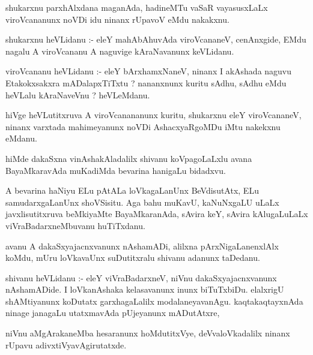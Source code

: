 \documentclass{article}
\begin{document}
\begin{mn}
shukarxnu  parxhAlxdana  maganAda,  hadineMTu  vaSaR  vayasusxLaLx  viroVcananunx  noVDi  idu  ninanx  
rUpavoV  eMdu  nakakxnu.
\end{mn}

\begin{mn}
shukarxnu  heVLidanu :- eleY  mahAbAhuvAda  viroVcananeV,  cenAnxgide,  EMdu  nagalu  A  viroVcananu  
A  naguvige  kAraNavanunx  keVLidanu.
\end{mn}

\begin{mn}
viroVcananu  heVLidanu :- eleY  bArxhamxNaneV,  ninanx  I  akAshada  naguvu  Etakokxsakxra  
mADalapxTiTxtu ?  nananxnunx  kuritu  sAdhu,  sAdhu  eMdu  heVLalu  kAraNaveVnu ?  heVLeMdanu.
\end{mn}

\begin{mn}
hiVge  heVLutitxruva  A  viroVcanananunx  kuritu,  shukarxnu  eleY  viroVcananeV,  ninanx  
varxtada  mahimeyanunx  noVDi  AshacxyaRgoMDu  iMtu  nakekxnu  eMdanu.
\end{mn}

\begin{mn}
hiMde  dakaSxna  vinAshakAladalilx  shivanu  koVpagoLaLxlu  avana  BayaMkaravAda  
muKadiMda  bevarina  hanigaLu  bidadxvu.
\end{mn}

\begin{mn}
A  bevarina  haNiyu  ELu  pAtALa  loVkagaLanUnx  BeVdisutAtx,  ELu  samudarxgaLanUnx  shoVSisitu.  
Aga  bahu  muKavU,  kaNuNxgaLU  uLaLx  javxlisutitxruva  beMkiyaMte  BayaMkaranAda,  sAvira  keY,  
sAvira  kAlugaLuLaLx  viVraBadarxneMbuvanu  huTiTxdanu.
\end{mn}

\begin{mn}
avanu  A  dakaSxyajacnxvanunx  nAshamADi,  alilxna  pArxNigaLanenxlAlx  koMdu,  mUru  loVkavaUnx  
suDutitxralu  shivanu  adanunx  taDedanu.
\end{mn}

\begin{mn}
shivanu  heVLidanu :- eleY  viVraBadarxneV,  niVnu  dakaSxyajacnxvanunx  nAshamADide.  I  
loVkanAshaka  kelasavanunx  inunx  biTuTxbiDu.  elalxrigU  shAMtiyanunx  koDutatx  garxhagaLalilx  
modalaneyavanAgu.  kaqtakaqtayxnAda  ninage  janagaLu  utatxmavAda  pUjeyanunx  mADutAtxre,
\end{mn}

\begin{mn}
niVnu  aMgArakaneMba  hesaranunx  hoMdutitxVye,  deVvaloVkadalilx  ninanx  rUpavu  adivxtiVyavAgirutatxde.
\end{mn}
\end{document}
